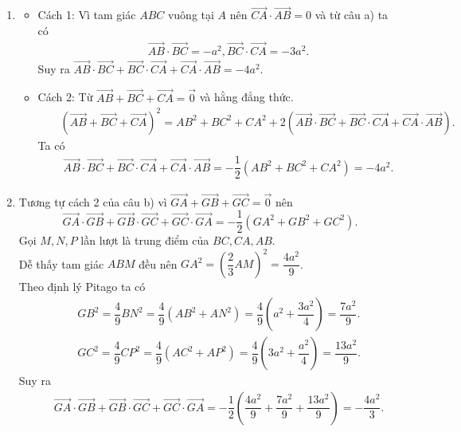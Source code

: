 \begin{vd}
{\begin{enumerate}
			\item
			\begin{itemize}
				\item Cách 1: Vì tam giác $ABC$ vuông tại $A$ nên $\overrightarrow{CA}\cdot\overrightarrow{AB}=0$ và từ câu a) ta có
				\begin{eqnarray*}
					&&\overrightarrow{AB}\cdot\overrightarrow{BC}=-a^2,\overrightarrow{BC}\cdot\overrightarrow{CA}=-3a^2.
				\end{eqnarray*}
				Suy ra $\overrightarrow{AB}\cdot\overrightarrow{BC}+\overrightarrow{BC}\cdot\overrightarrow{CA}+\overrightarrow{CA}\cdot\overrightarrow{AB}=-4a^2$.
				\item Cách 2: Từ $\overrightarrow{AB}+\overrightarrow{BC}+\overrightarrow{CA}=\overrightarrow{0}$ và hằng đẳng thức.
				\begin{eqnarray*}
					&&\left(\overrightarrow{AB}+\overrightarrow{BC}+\overrightarrow{CA}\right)^2=AB^2+BC^2+CA^2+2\left(\overrightarrow{AB}\cdot\overrightarrow{BC}+\overrightarrow{BC}\cdot\overrightarrow{CA}+\overrightarrow{CA}\cdot\overrightarrow{AB}\right).
				\end{eqnarray*}
				Ta có
				\begin{eqnarray*}
					&&\overrightarrow{AB}\cdot\overrightarrow{BC}+\overrightarrow{BC}\cdot\overrightarrow{CA}+\overrightarrow{CA}\cdot\overrightarrow{AB}=-\dfrac{1}{2}\left(AB^2+BC^2+CA^2\right)=-4a^2.
				\end{eqnarray*}
			\end{itemize}
			\item Tương tự cách 2 của câu b) vì $\overrightarrow{GA}+\overrightarrow{GB}+\overrightarrow{GC}=\overrightarrow{0}$ nên
			$$\overrightarrow{GA}\cdot\overrightarrow{GB}+\overrightarrow{GB}\cdot\overrightarrow{GC}+\overrightarrow{GC}\cdot\overrightarrow{GA}
				=-\dfrac{1}{2}\left(GA^2+GB^2+GC^2\right).$$
			Gọi $M,N,P$ lần lượt là trung điểm của $BC,CA,AB$.\\
			Dễ thấy tam giác $ABM$ đều nên $GA^2=\left(\dfrac{2}{3}AM\right)^2=\dfrac{4a^2}{9}$.\\
			Theo định lý Pitago ta có
			\begin{eqnarray*}
				&&GB^2=\dfrac{4}{9}BN^2=\dfrac{4}{9}\left(AB^2+AN^2\right)=\dfrac{4}{9}\left(a^2+\dfrac{3a^2}{4}\right)=\dfrac{7a^2}{9}.\\
				&&	GC^2=\dfrac{4}{9}CP^2=\dfrac{4}{9}\left(AC^2+AP^2\right)=\dfrac{4}{9}\left(3a^2+\dfrac{a^2}{4}\right)=\dfrac{13a^2}{9}.
			\end{eqnarray*}
			Suy ra
			\begin{eqnarray*}
				&&	\overrightarrow{GA}\cdot\overrightarrow{GB}+\overrightarrow{GB}\cdot\overrightarrow{GC}+\overrightarrow{GC}\cdot\overrightarrow{GA}=-\dfrac{1}{2}(\dfrac{4a^2}{9}+\dfrac{7a^2}{9}+\dfrac{13a^2}{9})=-\dfrac{4a^2}{3}.
			\end{eqnarray*}
		\end{enumerate}
	}
\end{vd}

